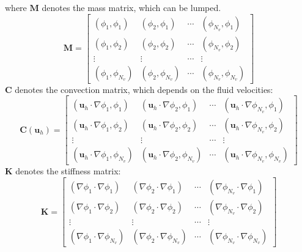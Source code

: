 where $\mathbf{M}$ denotes the mass matrix, which can be lumped.
\begin{equation*}
	\mathbf{M} =
	\begin{bmatrix}
		\left(\phi_1, \phi_1\right) & \left(\phi_2, \phi_1\right) & \cdots & \left(\phi_{N_v}, \phi_1\right) \\
		\left(\phi_1, \phi_2\right) & \left(\phi_2, \phi_2\right) & \cdots & \left(\phi_{N_v}, \phi_2\right) \\
		\vdots & \vdots & \cdots & \vdots \\
		\left(\phi_1, \phi_{N_v}\right) & \left(\phi_2, \phi_{N_v}\right) & \cdots & \left(\phi_{N_v}, \phi_{N_v}\right)
	\end{bmatrix}
\end{equation*}
$\mathbf{C}$ denotes the convection matrix, which depends on the fluid velocities:
\begin{equation*}
	\mathbf{C}(\mathbf{u}_h) = \begin{bmatrix}
		\left(\mathbf{u}_h\cdot\nabla\phi_1, \phi_1\right) & \left(\mathbf{u}_h\cdot\nabla\phi_2, \phi_1\right) & \cdots & \left(\mathbf{u}_h\cdot\nabla\phi_{N_v}, \phi_1\right)\\
		\left(\mathbf{u}_h\cdot\nabla\phi_1, \phi_2\right) & \left(\mathbf{u}_h\cdot\nabla\phi_2, \phi_2\right) & \cdots & \left(\mathbf{u}_h\cdot\nabla\phi_{N_v}, \phi_2\right)\\
		\vdots & \vdots & \cdots & \vdots \\
		\left(\mathbf{u}_h\cdot\nabla\phi_1, \phi_{N_v}\right) & \left(\mathbf{u}_h\cdot\nabla\phi_2, \phi_{N_v}\right) & \cdots & \left(\mathbf{u}_h\cdot\nabla\phi_{N_v}, \phi_{N_v}\right)
	\end{bmatrix}
\end{equation*}
$\mathbf{K}$ denotes the stiffness matrix:
\begin{equation*}
	\mathbf{K} = \begin{bmatrix}
		\left(\nabla\phi_1\cdot\nabla\phi_1\right) & \left(\nabla\phi_2\cdot\nabla\phi_1\right) &
		\cdots &
		\left(\nabla\phi_{N_v}\cdot\nabla\phi_1\right) \\
		\left(\nabla\phi_1\cdot\nabla\phi_2\right) & \left(\nabla\phi_2\cdot\nabla\phi_2\right) &
		\cdots &
		\left(\nabla\phi_{N_v}\cdot\nabla\phi_2\right) \\
		\vdots & \vdots & \cdots & \vdots \\
		\left(\nabla\phi_1\cdot\nabla\phi_{N_v}\right) & \left(\nabla\phi_2\cdot\nabla\phi_{N_v}\right) &
		\cdots &
		\left(\nabla\phi_{N_v}\cdot\nabla\phi_{N_v}\right)
	\end{bmatrix}
\end{equation*}

